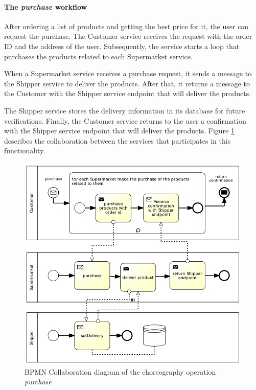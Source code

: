 \paragraph{The \emph{purchase} workflow\\}
After ordering a list of products and getting the best price for it, the user can request the purchase. The Customer service receives the request with the order ID and the address of the user. Subsequently, the service starts a loop that purchases the products related to each Supermarket service.

When a Supermarket service receives a purchase request, it sends a message to the Shipper service to deliver the products. After that, it returns a message to the Customer with the Shipper service endpoint that will deliver the products.

The Shipper service stores the delivery information in its database for future verifications. Finally, the Customer service returns to the user a confirmation with the Shipper service endpoint that will deliver the products. Figure \ref{purchaseworkflow} describes the collaboration between the services that participates in this functionality.

\begin{figure}[htbp]
\begin{center}
	\includegraphics{images/purchaseworkflow}
\caption{BPMN Collaboration diagram of the choreography operation \emph{purchase}}
\label{purchaseworkflow}
\end{center}
\end{figure}

